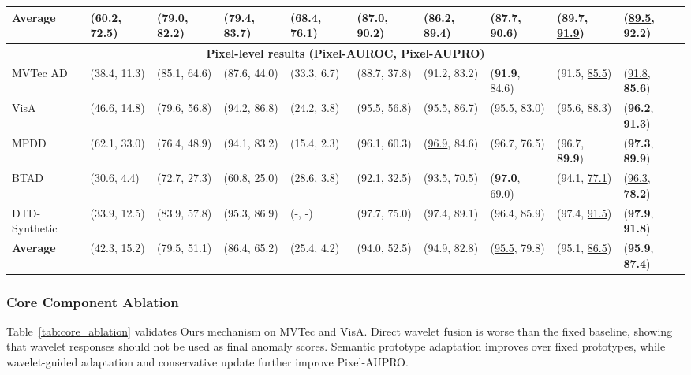 \documentclass[runningheads]{llncs}
\begin{document}
\begin{table}[htbp]
{\begin{tabular}{llllllllll}
      \midrule
      \textbf{Average} & (60.2, 72.5) & (79.0, 82.2) & (79.4, 83.7) & (68.4, 76.1) & (87.0, 90.2) & (86.2, 89.4) & (87.7, 90.6) & (\textbf{89.7}, \underline{91.9}) & (\underline{89.5}, \textbf{92.2}) \\
      \midrule
      \multicolumn{10}{c}{\textbf{Pixel-level results (Pixel-AUROC, Pixel-AUPRO)}} \\
      \midrule
      MVTec AD & (38.4, 11.3) & (85.1, 64.6) & (87.6, 44.0) & (33.3, 6.7) & (88.7, 37.8) & (91.2, 83.2) & (\textbf{91.9}, 84.6) & (91.5, \underline{85.5}) & (\underline{91.8}, \textbf{85.6}) \\
      VisA & (46.6, 14.8) & (79.6, 56.8) & (94.2, 86.8) & (24.2, 3.8) & (95.5, 56.8) & (95.5, 86.7) & (95.5, 83.0) & (\underline{95.6}, \underline{88.3}) & (\textbf{96.2}, \textbf{91.3}) \\
      MPDD & (62.1, 33.0) & (76.4, 48.9) & (94.1, 83.2) & (15.4, 2.3) & (96.1, 60.3) & (\underline{96.9}, 84.6) & (96.7, 76.5) & (96.7, \textbf{89.9}) & (\textbf{97.3}, \textbf{89.9}) \\
      BTAD & (30.6, 4.4) & (72.7, 27.3) & (60.8, 25.0) & (28.6, 3.8) & (92.1, 32.5) & (93.5, 70.5) & (\textbf{97.0}, 69.0) & (94.1, \underline{77.1}) & (\underline{96.3}, \textbf{78.2}) \\
      DTD-Synthetic & (33.9, 12.5) & (83.9, 57.8) & (95.3, 86.9) & (-, -) & (97.7, 75.0) & (97.4, 89.1) & (96.4, 85.9) & (97.4, \underline{91.5}) & (\textbf{97.9}, \textbf{91.8}) \\
      \midrule
      \textbf{Average} & (42.3, 15.2) & (79.5, 51.1) & (86.4, 65.2) & (25.4, 4.2) & (94.0, 52.5) & (94.9, 82.8) & (\underline{95.5}, 79.8) & (95.1, \underline{86.5}) & (\textbf{95.9}, \textbf{87.4}) \\
      \bottomrule
    \end{tabular}%
  }
\end{table}

\subsubsection{Core Component Ablation}
Table~\ref{tab:core_ablation} validates Ours mechanism on MVTec and VisA. Direct wavelet fusion is worse than the fixed baseline, showing that wavelet responses should not be used as final anomaly scores. Semantic prototype adaptation improves over fixed prototypes, while wavelet-guided adaptation and conservative update further improve Pixel-AUPRO.
\end{document}
